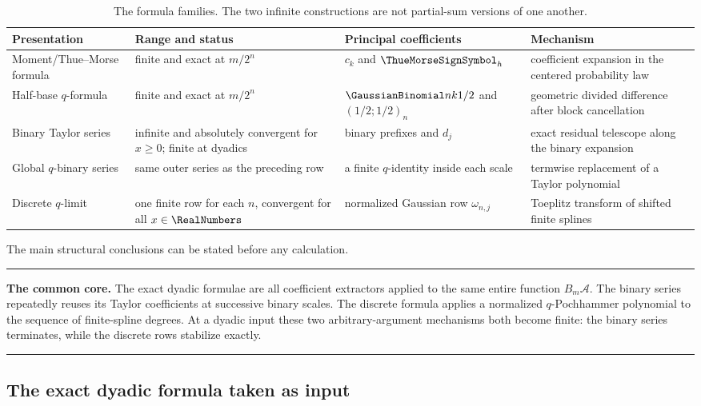 \documentclass[11pt,oneside]{article}
\theoremstyle{definition}
\theoremstyle{remark}
\newenvironment{boxedremark}{%
  \par\smallskip\noindent\begin{center}\begin{minipage}{0.94\textwidth}%
  \color{black}\hrule\vspace{0.6em}\small
}{%
  \vspace{0.6em}\hrule\end{minipage}\end{center}\smallskip
}
\begin{document}
\begin{table}[ht]
\centering
\small
\begin{tabularx}{\textwidth}{@{}>{\raggedright\arraybackslash}p{}
>{\raggedright\arraybackslash}p{}
>{\raggedright\arraybackslash}p{}X@{}}
\toprule
Presentation & Range and status & Principal coefficients & Mechanism \\
\midrule
Moment/Thue--Morse formula & finite and exact at $m/2^n$ & $c_k$ and $\ThueMorseSignSymbol_h$ & coefficient expansion in the centered probability law \\
Half-base $q$-formula & finite and exact at $m/2^n$ & $\GaussianBinomial nk{1/2}$ and $(1/2;1/2)_n$ & geometric divided difference after block cancellation \\
Binary Taylor series & infinite and absolutely convergent for $x\ge0$; finite at dyadics & binary prefixes and $d_j$ & exact residual telescope along the binary expansion \\
Global $q$-binary series & same outer series as the preceding row & a finite $q$-identity inside each scale & termwise replacement of a Taylor polynomial \\
Discrete $q$-limit & one finite row for each $n$, convergent for all $x\in\RealNumbers$ & normalized Gaussian row $\omega_{n,j}$ & Toeplitz transform of shifted finite splines \\
\bottomrule
\end{tabularx}
\caption{The formula families.  The two infinite constructions are not partial-sum versions
of one another.}
\label{dyadicweb:tab:formula-map}
\end{table}

The main structural conclusions can be stated before any calculation.

\begin{boxedremark}
\textbf{The common core.}
The exact dyadic formulae are all coefficient extractors applied to the same entire function
$B_m\mathscr A$.  The binary series repeatedly reuses its Taylor coefficients at successive
binary scales.  The discrete formula applies a normalized $q$-Pochhammer polynomial to the
sequence of finite-spline degrees.  At a dyadic input these two arbitrary-argument mechanisms
both become finite: the binary series terminates, while the discrete rows stabilize exactly.
\end{boxedremark}

\subsection{The exact dyadic formula taken as input}
\end{document}
